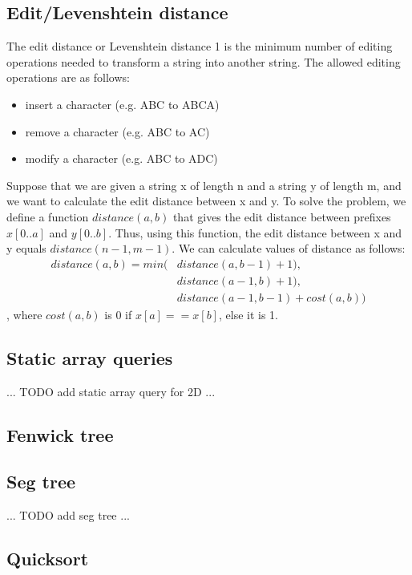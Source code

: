 \documentclass[a4paper]{article}
\begin{document}
\subsection{Edit/Levenshtein distance}
The edit distance or Levenshtein distance 1 is the minimum number of editing operations needed to transform a string into another string. The allowed editing operations are as follows:
\begin{itemize}
  \item insert a character (e.g. ABC to ABCA)
  \item remove a character (e.g. ABC to AC)
  \item modify a character (e.g. ABC to ADC)
\end{itemize}
Suppose that we are given a string x of length n and a string y of length m, and we want to calculate the edit distance between x and y. To solve the problem, we define a function $distance(a, b)$ that gives the edit distance between prefixes
$x[0..a]$ and $y[0..b]$. Thus, using this function, the edit distance between x and y equals $distance(n - 1, m - 1)$.
We can calculate values of distance as follows:
\begin{align}
  distance(a, b) = min(&distance(a, b - 1) + 1), \\
                       &distance(a - 1, b) + 1), \\
                       &distance(a - 1, b - 1) + cost(a, b))
\end{align}
, where $cost(a, b)$ is 0 if $x[a] == x[b]$, else it is 1.


\subsection{Static array queries}
... TODO add static array query for 2D ...


\subsection{Fenwick tree}



\subsection{Seg tree}
... TODO add seg tree ...


\subsection{Quicksort}

\end{document}
